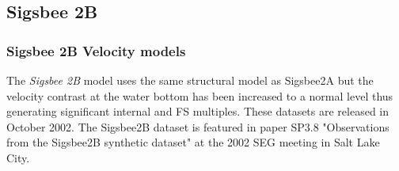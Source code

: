 
\subsection{Sigsbee 2B}
\subsubsection{Sigsbee 2B Velocity models}
The \emph{Sigsbee 2B} model uses the same structural model as Sigsbee2A but the velocity contrast at the water bottom has been increased to a normal level thus generating significant internal and FS multiples. These datasets are released in October 2002. The Sigsbee2B dataset is featured in paper SP3.8 "Observations from the Sigsbee2B synthetic dataset" at the 2002 SEG meeting in Salt Lake City.  


{
\tiny

\normalsize
}



